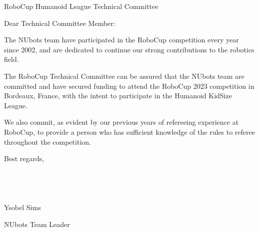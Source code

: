 \documentclass{letter}
\begin{document}
\begin{letter}{RoboCup Humanoid League Technical Committee}
\opening{Dear Technical Committee Member:}

The NUbots team have participated in the RoboCup competition every year since 2002, and are dedicated to continue our strong contributions to the robotics field.

The RoboCup Technical Committee can be assured that the NUbots team are committed and have secured funding to attend the RoboCup 2023 competition in Bordeaux, France, with the intent to participate in the Humanoid KidSize League.

We also commit, as evident by our previous years of refereeing experience at RoboCup, to provide a person who has sufficient knowledge of the rules to referee throughout the competition.

Best regards, \\ \\ \\ \\ \\ 

\hspace*{20pt} Ysobel Sims

NUbots Team Leader

\end{letter}
\end{document}
